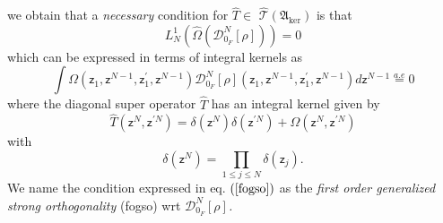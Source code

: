 \documentclass[aps,preprint]{revtex4}%
\begin{document}
we obtain that a \emph{necessary} condition for $\hat{T}\in$ $\mathcal{\hat
{T}}\left(  \mathfrak{A}_{\ker}\right)  $ is that
\begin{equation}
L_{N}^{1}\left(  \hat{\Omega}\left(  \mathcal{D}_{0_{F}}^{N}\left[
\rho\right]  \right)  \right)  =0
\end{equation}
which can be expressed in terms of integral kernels as
\begin{equation}
\int\Omega\left(  \mathsf{z}_{1},\mathsf{z}^{N-1},\mathsf{z}_{1}^{\prime
},\mathsf{z}^{N-1}\right)  \mathcal{D}_{0_{F}}^{N}\left[  \rho\right]  \left(
\mathsf{z}_{1},\mathsf{z}^{N-1},\mathsf{z}_{1}^{\prime},\mathsf{z}%
^{N-1}\right)  d\mathsf{z}^{N-1}\overset{a.e}{=}0 \label{fogso}%
\end{equation}
where the diagonal super operator $\hat{T}$ has an integral kernel given by
\begin{equation}
\hat{T}\left(  \mathsf{z}^{N},\mathsf{z}^{\prime N}\right)  =\delta\left(
\mathsf{z}^{N}\right)  \delta\left(  \mathsf{z}^{\prime N}\right)
+\Omega\left(  \mathsf{z}^{N},\mathsf{z}^{\prime N}\right)  \label{supker}%
\end{equation}
with
\begin{equation}
\delta\left(  \mathsf{z}^{N}\right)  =%
{\displaystyle\prod\limits_{1\leq j\leq N}}
\delta\left(  \mathsf{z}_{j}\right)  .
\end{equation}
We name the condition expressed in eq. $\left(  \ref{fogso}\right)  $ as the
\textit{first order generalized strong orthogonality }(fogso) wrt
$\mathcal{D}_{0_{F}}^{N}\left[  \rho\right]  $\textit{.}
\end{document}
